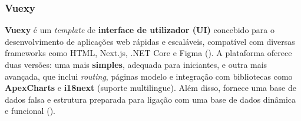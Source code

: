 \subsubsection{Vuexy}

\textbf{Vuexy} é um \textit{template} de \textbf{interface de utilizador (UI)} concebido para o desenvolvimento de aplicações web rápidas e escaláveis, compatível com diversas frameworks como HTML, Next.js, .NET Core e Figma (\cite{PixInvent2025}). A plataforma oferece duas versões: uma mais \textbf{simples}, adequada para iniciantes, e outra mais avançada, que inclui \textit{routing}, páginas modelo e integração com bibliotecas como \textbf{ApexCharts} e \textbf{i18next} (suporte multilingue). Além disso, fornece uma base de dados falsa e estrutura preparada para ligação com uma base de dados dinâmica e funcional (\cite{Vuexy2025}).

 \vspace{20mm}